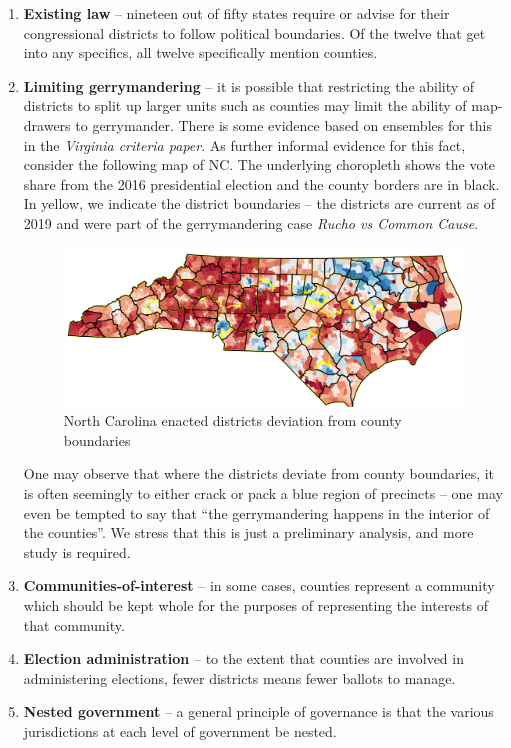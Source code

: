 \documentclass{mgggarticle}
\begin{document}
\begin{enumerate}
\item \textbf{Existing law} -- nineteen out of fifty states require or advise for their congressional districts to follow political boundaries. Of the twelve that get into any specifics, all twelve specifically mention counties.

\item \textbf{Limiting gerrymandering} -- it is possible that restricting the ability of districts to split up larger units such as counties may limit the ability of map-drawers to gerrymander.  There is some evidence based on ensembles for this in the \emph{Virginia criteria paper}. As further informal evidence for this fact, consider the following map of NC. The underlying choropleth shows the vote share from the 2016 presidential election and the county borders are in black. In yellow, we indicate the district boundaries -- the districts are current as of 2019 and were part of the gerrymandering case \emph{Rucho vs Common Cause}. 
\begin{figure}[h]
\centering
\includegraphics[width=\textwidth]{figs/NC_counties.png}
\caption{North Carolina enacted districts deviation from county boundaries}
\end{figure}
One may observe that where the districts deviate from county boundaries, it is often seemingly to either crack or pack a blue region of precincts -- one may even be tempted to say that ``the gerrymandering happens in the interior of the counties''. We stress that this is just a preliminary analysis, and more study is required.

\item \textbf{Communities-of-interest} -- in some cases, counties represent a community which should be kept whole for the purposes of representing the interests of that community. 

\item \textbf{Election administration} -- to the extent that counties are involved in administering elections, fewer districts means fewer ballots to manage.

\item \textbf{Nested government} -- a general principle of governance is that the various jurisdictions at each level of government be nested.
\end{enumerate}
 
\end{document}
